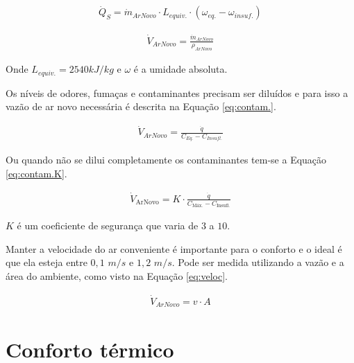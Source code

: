 \documentclass[acronym,symbols,table]{fei}
\begin{document}
\begin{equation} \label{eq:umidQ}
\begin{aligned}
    \dot{Q}_{S}=\dot{m}_{ArNovo}\cdot {{L}_{equiv.}}\cdot({\omega_{eq.}-\omega_{insuf.}})
\end{aligned}
\end{equation}

\begin{equation} \label{eq:umidV}
\begin{aligned}
   \dot{V}_{ArNovo}=\frac{\dot{m}_{ArNovo}}{\rho_{ArNovo}}
\end{aligned}
\end{equation}

Onde ${L}_{equiv.}= 2540 kJ/kg$ e $\omega$ é a umidade absoluta.

Os níveis de odores, fumaças e contaminantes precisam ser diluídos e para isso a vazão de ar novo necessária é descrita na Equação \ref{eq:contam.}.

\begin{equation} \label{eq:contam.}
    \begin{aligned}
     \dot{V}_{ArNovo}=\frac{\dot{q}}{C_{Eq.}-C_{Insufl.}}
    \end{aligned}
\end{equation}

Ou quando não se dilui completamente os contaminantes tem-se a Equação \ref{eq:contam.K}.

\begin{equation} \label{eq:contam.K}
    \begin{aligned}
\dot{V}_{\text{ArNovo}} = K \cdot \frac{\dot{q}}{C_{\text{Máx.}} - C_{\text{Insufl.}}}
   \end{aligned}
\end{equation}

$K$ é um coeficiente de segurança que varia de $3$ a $10$.

Manter a velocidade do ar conveniente é importante para o conforto e o ideal é que ela esteja entre $0,1$ $m/s$ e $1,2$ $m/s$. Pode ser medida utilizando a vazão e a área do ambiente, como visto na Equação \ref{eq:veloc}.

\begin{equation} \label{eq:veloc}
\begin{aligned}
   \dot{V}_{ArNovo}=v\cdot{A}
\end{aligned}
\end{equation}

\section{Conforto térmico} \label{confortotermico}
\end{document}
